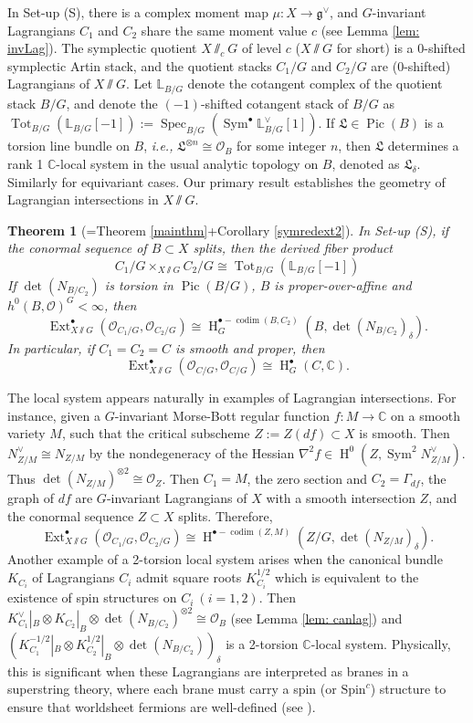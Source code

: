 \documentclass[12pt]{amsart}
\newtheorem{theorem}{Theorem}[section]
\theoremstyle{definition}
\theoremstyle{remark}
\numberwithin{equation}{section}
\newcommand{\CC}{\mathbb{C}}
\newcommand{\LL}{\mathbb{L}}
\newcommand{\shO}{\mathcal{O}}
\newcommand{\codim}{\operatorname{codim}}
\newcommand{\Ext}{\operatorname{Ext}}
\newcommand{\Pic}{\operatorname{Pic}}
\newcommand{\Spec}{\operatorname{Spec}}
\newcommand{\Sym}{\operatorname{Sym}}
\newcommand{\Tot}{\operatorname{Tot}}
\newcommand{\arw}{\longrightarrow}
\newcommand{\Hdot}{\operatorname{H}}
\begin{document}
In Set-up (S), there is a complex moment map $\mu: X\rightarrow \mathfrak{g}^{\vee}$, and $G$-invariant Lagrangians $C_1$ and $C_2$ share the same moment value $c$ (see Lemma \ref{lem: invLag}). The symplectic quotient $X\sslash_c G$ of level $c$ ($X\sslash G$ for short) is a 0-shifted symplectic Artin stack, and the quotient stacks $C_1/G$ and $C_2/G$ are (0-shifted) Lagrangians of $X\sslash G$.
Let $\LL_{B/G}$ denote the cotangent complex of the quotient stack $B/G$, and denote the $(-1)$-shifted cotangent stack of $B/G$ as $\Tot_{B/G}(\LL_{B/G}[-1]):=\Spec_{B/G}(\Sym^{\bullet} \LL_{B/G}^{\vee}[1])$. If $\mathfrak{L}\in \Pic(B)$ is a torsion line bundle on $B$, \emph{i.e.,} $\mathfrak{L}^{\otimes n}\cong \shO_B$ for some integer $n$, then $\mathfrak{L}$ determines a rank 1 $\CC$-local system in the usual analytic topology on $B$, denoted as $\mathfrak{L}_{\delta}$. Similarly for equivariant cases. Our primary result establishes the geometry of Lagrangian intersections in $X\sslash  G$.  

\begin{theorem}[=Theorem \ref{mainthm}+Corollary \ref{symredext2}]
In Set-up (S), if the conormal sequence of $B\subset X$ splits, then the derived fiber product 
    $$C_1/G\times_{X\sslash  G} C_2/G\cong \Tot_{B/G}(\LL_{B/G}[-1])$$
If $\det(N_{B/C_2})$ is torsion in $\Pic(B/G)$, $B$ is proper-over-affine and $h^0(B, \shO)^{G}<\infty$, then 
    $$\Ext^{\bullet}_{X\sslash G}(\shO_{C_1/G}, \shO_{C_2/G})\cong \Hdot^{\bullet-\codim(B, C_2)}_G(B, \det(N_{B/C_2})_{\delta}).$$
   In particular, if $C_1=C_2=C$ is smooth and proper, then $$\Ext^{\bullet}_{X\sslash G}(\shO_{C/G}, \shO_{C/G})\cong \Hdot^{\bullet}_G(C, \CC).$$
   \end{theorem}
The local system appears naturally in examples of Lagrangian intersections. For instance, given a $G$-invariant Morse-Bott regular function  $f: M\arw \CC$ on a smooth variety $M$, such that the critical subscheme $Z:=Z(df)\subset X$ is smooth. Then $N_{Z/M}^{\vee}\cong N_{Z/M}$ by the nondegeneracy of the Hessian $\nabla^2 f\in \Hdot^0(Z, \Sym^2 N_{Z/M}^{\vee})$. Thus 
$\det(N_{Z/M})^{\otimes 2}\cong \shO_Z$. Then $C_1=M$, the zero section and $C_2=\Gamma_{df}$, the graph of $df$ are $G$-invariant Lagrangians of $X$ with a smooth intersection $Z$, and the conormal sequence $Z\subset X$ splits. Therefore,
$$\Ext_{X\sslash G}^{\bullet}(\shO_{C_1/G}, \shO_{C_2/G})\cong \Hdot^{\bullet-\codim(Z, M)}(Z/G, \det(N_{Z/M})_{\delta}).$$
Another example of a 2-torsion local system arises when the canonical bundle $K_{C_i}$ of Lagrangians $C_i$ admit square roots $K_{C_i}^{1/2}$ which is equivalent to the existence of spin structures on $C_i~ (i=1,2)$. Then $K_{C_1}^{\vee}|_B\otimes K_{C_2}|_B\otimes \det(N_{B/C_2})^{\otimes 2}\cong \shO_B$ (see Lemma \ref{lem: canlag}) and $(K_{C_1}^{-1/2}|_B\otimes K_{C_2}^{1/2}|_B\otimes \det(N_{B/C_2}))_{\delta}$ is a 2-torsion $\CC$-local system. Physically, this is significant when these Lagrangians are interpreted as branes in a superstring theory, where each brane must carry a spin (or $\text{Spin}^c$) structure to ensure that worldsheet fermions are well-defined (see \cite{freed1999anomalies}). 
\end{document}
